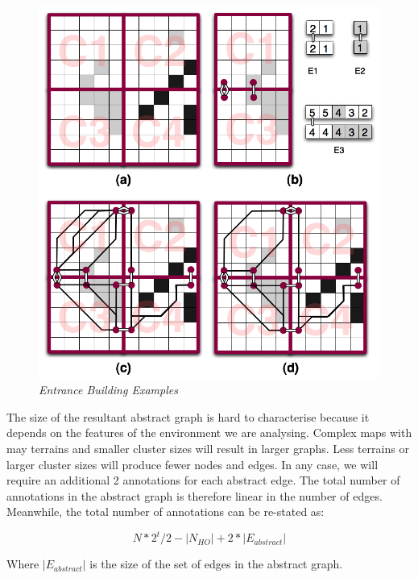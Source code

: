 \begin{figure}[htbp]
        \caption{\emph{Entrance Building Examples} }
        \begin{center}
                        \includegraphics[scale=0.25]{diagrams/clusters_and_entrances.png}
        \end{center}
        \label{aha-fig:abstractgraph}
\end{figure}

The size of the resultant abstract graph is hard to characterise because it depends on the features of the environment we are analysing. Complex maps with may terrains and smaller cluster sizes will result in larger graphs. Less terrains or larger cluster sizes will produce fewer nodes and edges. In any case, we will require an additional 2 annotations for each abstract edge. The total number of annotations in the abstract graph is therefore linear in the number of edges. Meanwhile, the total number of annotations can be re-stated as: 

\begin{equation}
N*2^t/2 - |N_{HO}| + 2*|E_{abstract}|
\label{aha-eq:totalannotations}
\end{equation}

Where $|E_{abstract}|$ is the size of the set of edges in the abstract graph.

